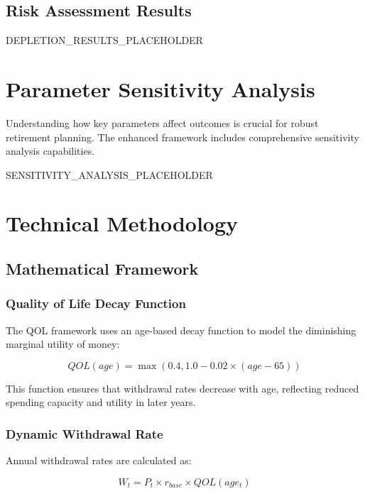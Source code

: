 \documentclass[11pt,a4paper]{article}
\begin{document}
\subsection{Risk Assessment Results}
DEPLETION_RESULTS_PLACEHOLDER

\section{Parameter Sensitivity Analysis}

Understanding how key parameters affect outcomes is crucial for robust retirement planning. The enhanced framework includes comprehensive sensitivity analysis capabilities.

SENSITIVITY_ANALYSIS_PLACEHOLDER

\section{Technical Methodology}

\subsection{Mathematical Framework}

\subsubsection{Quality of Life Decay Function}

The QOL framework uses an age-based decay function to model the diminishing marginal utility of money:

\begin{equation}
QOL(age) = \max(0.4, 1.0 - 0.02 \times (age - 65))
\end{equation}

This function ensures that withdrawal rates decrease with age, reflecting reduced spending capacity and utility in later years.

\subsubsection{Dynamic Withdrawal Rate}

Annual withdrawal rates are calculated as:

\begin{equation}
W_t = P_t \times r_{base} \times QOL(age_t)
\end{equation}
\end{document}
